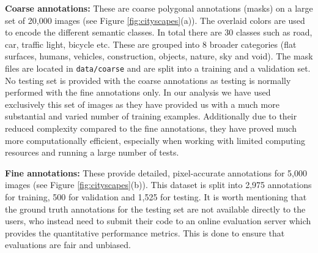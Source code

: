 \textbf{Coarse annotations:} These are coarse polygonal annotations (masks) on a large set of 20,000 images (see Figure \ref{fig:cityscapes}(a)). The overlaid colors are used to encode the different semantic classes. In total there are 30 classes such as road, car, traffic light, bicycle etc. These are grouped into 8 broader categories (flat surfaces, humans, vehicles, construction, objects, nature, sky and void). The mask files are located in \small\texttt{data/coarse} and are split into a training and a validation set. No testing set is provided with the coarse annotations as testing is normally performed with the fine annotations only. In our analysis we have used exclusively this set of images as they have provided us with a much more substantial and varied number of training examples. Additionally due to their reduced complexity compared to the fine annotations, they have proved much more computationally efficient, especially when working with limited computing resources and running a large number of tests.

\textbf{Fine annotations:} These provide detailed, pixel-accurate annotations for 5,000 images (see Figure \ref{fig:cityscapes}(b)). This dataset is split into 2,975 annotations for training, 500 for validation and 1,525 for testing. It is worth mentioning that the ground truth annotations for the testing set are not available directly to the users, who instead need to submit their code to an online evaluation server which provides the quantitative performance metrics. This is done to ensure that evaluations are fair and unbiased.

